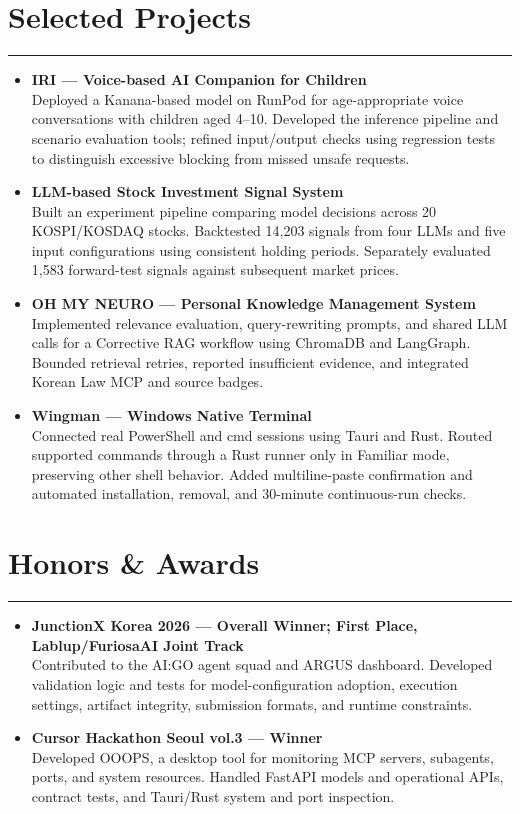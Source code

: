 \documentclass[letterpaper,10pt]{article}
\begin{document}
\section*{Selected Projects}
\hrule
\vspace{4pt}
\begin{itemize}
\item \textbf{IRI --- Voice-based AI Companion for Children} \\
Deployed a Kanana-based model on RunPod for age-appropriate voice conversations with children aged 4--10. Developed the inference pipeline and scenario evaluation tools; refined input/output checks using regression tests to distinguish excessive blocking from missed unsafe requests.
\item \textbf{LLM-based Stock Investment Signal System} \\
Built an experiment pipeline comparing model decisions across 20 KOSPI/KOSDAQ stocks. Backtested 14,203 signals from four LLMs and five input configurations using consistent holding periods. Separately evaluated 1,583 forward-test signals against subsequent market prices.
\item \textbf{OH MY NEURO --- Personal Knowledge Management System} \\
Implemented relevance evaluation, query-rewriting prompts, and shared LLM calls for a Corrective RAG workflow using ChromaDB and LangGraph. Bounded retrieval retries, reported insufficient evidence, and integrated Korean Law MCP and source badges.
\item \textbf{Wingman --- Windows Native Terminal} \\
Connected real PowerShell and cmd sessions using Tauri and Rust. Routed supported commands through a Rust runner only in Familiar mode, preserving other shell behavior. Added multiline-paste confirmation and automated installation, removal, and 30-minute continuous-run checks.
\end{itemize}


\section*{Honors \& Awards}
\hrule
\vspace{4pt}
\begin{itemize}
\item \textbf{JunctionX Korea 2026 --- Overall Winner; First Place, Lablup/FuriosaAI Joint Track} \\
Contributed to the AI:GO agent squad and ARGUS dashboard. Developed validation logic and tests for model-configuration adoption, execution settings, artifact integrity, submission formats, and runtime constraints.
\item \textbf{Cursor Hackathon Seoul vol.3 --- Winner} \\
Developed OOOPS, a desktop tool for monitoring MCP servers, subagents, ports, and system resources. Handled FastAPI models and operational APIs, contract tests, and Tauri/Rust system and port inspection.
\end{itemize}
\end{document}

